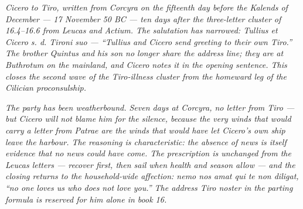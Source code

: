 
\textit{Cicero to Tiro, written from Corcyra on the fifteenth
day before the Kalends of December --- 17 November 50 BC ---
ten days after the three-letter cluster of 16.4--16.6 from
Leucas and Actium. The salutation has narrowed: \textit{Tullius
et Cicero s. d. Tironi suo} --- ``Tullius and Cicero send
greeting to their own Tiro.'' The brother Quintus and his son
no longer share the address line; they are at Buthrotum on the
mainland, and Cicero notes it in the opening sentence. This
closes the second wave of the Tiro-illness cluster from the
homeward leg of the Cilician proconsulship.}

\textit{The party has been weatherbound. Seven days at Corcyra,
no letter from Tiro --- but Cicero will not blame him for the
silence, because the very winds that would carry a letter from
Patrae are the winds that would have let Cicero's own ship
leave the harbour. The reasoning is characteristic: the absence
of news is itself evidence that no news could have come. The
prescription is unchanged from the Leucas letters --- recover
first, then sail when health and season allow --- and the
closing returns to the household-wide affection: \textit{nemo
nos amat qui te non diligat}, ``no one loves us who does not
love you.'' The address \textit{Tiro noster} in the parting
formula is reserved for him alone in book 16.}
